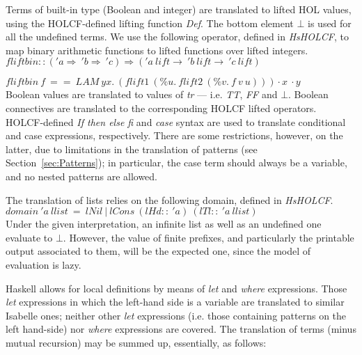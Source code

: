 \documentclass{llncs}
\begin{document}

Terms of built-in type (Boolean and integer) are translated to lifted HOL
values, using the HOLCF-defined lifting function \emph{Def}.  The bottom
element $\bot$ is used for all the undefined terms.  We use the following
operator, defined in \emph{HsHOLCF}, to map binary arithmetic functions to
lifted functions over lifted integers.\\

$fliftbin :: ('a \Rightarrow \ 'b \Rightarrow \ 'c) 
  \Rightarrow ('a \ lift \to \ 'b \ lift \to \ 'c \ lift) $
 
$fliftbin \ f \ == \ LAM \ y x. \ (flift1 \ (\%u. \ flift2 \ (\%v. \ f \ v \ u))) \cdot x \ \cdot y $\\

\noindent Boolean values are translated to values of \emph{tr} --- i.e.
\emph{TT}, \emph{FF} and $\bot$. Boolean connectives are translated to the
corresponding HOLCF lifted operators. HOLCF-defined \emph{If then else fi} and
\emph{case} syntax are used to translate conditional and case expressions,
respectively. There are some restrictions, however, on the latter, due to
limitations in the translation of patterns (see Section~\ref{sec:Patterns});
in particular, the case term should always be a variable, and no nested
patterns are allowed.

The translation of lists relies on the following domain, defined in \emph{HsHOLCF}.\\

$domain \ 'a\ llist \ = \ lNil \ | \ lCons \ (lHd :: \ 'a) \ (lTl :: \ 'a \ llist) $\\

\noindent Under the given interpretation, an infinite list as well as 
an undefined one evaluate to $\bot$. However, the value of finite prefixes,
and particularly the printable output associated to them, will be the expected
one, since the model of evaluation is lazy.

Haskell allows for local definitions by means of \emph{let} and \emph{where}
expressions. Those \emph{let} expressions in which the left-hand side is a
variable are translated to similar Isabelle ones; neither other \emph{let}
expressions (i.e. those containing patterns on the left hand-side) nor
\emph{where} expressions are covered. The translation of terms (minus mutual
recursion) may be summed up, essentially, as follows:
\end{document}
